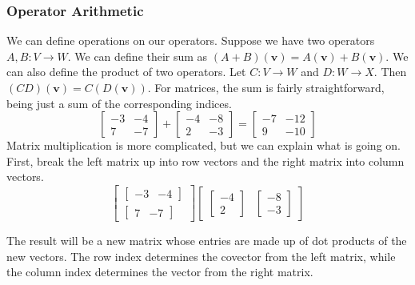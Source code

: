 \documentclass[10pt]{beamer}
\begin{document}
\begin{frame}
  \frametitle{Operator Arithmetic}
  We can define operations on our operators. Suppose we have two operators $A, B: V\rightarrow W$. We can define their sum as $\left(A + B\right)(\mathbf{v}) = A(\mathbf{v}) + B(\mathbf{v})$. We can also define the product of two operators. Let $C: V\rightarrow W$ and $D: W\rightarrow X$. Then $\left(CD\right)(\mathbf{v}) = C\left(D(\mathbf{v})\right)$. For matrices, the sum is fairly straightforward, being just a sum of the corresponding indices.
  $$\left[\begin{matrix}
      -3 & -4\\
      7 & -7
    \end{matrix}\right] + \left[\begin{matrix}
      -4 & -8\\
      2 & -3
    \end{matrix}\right] = \left[\begin{matrix}
      -7 & -12\\
      9 & -10
    \end{matrix}\right]$$
  Matrix multiplication is more complicated, but we can explain what is going on. First, break the left matrix up into row vectors and the right matrix into column vectors.
  $$\left[\begin{matrix}
      \left[\begin{matrix}
          -3 & -4\end{matrix}\right] \\
      \left[\begin{matrix}
          7 & -7\end{matrix}\right]\end{matrix}\right]\left[\begin{matrix}
      \left[\begin{matrix}
          -4\\
          2\end{matrix}\right] & \left[\begin{matrix}
          -8\\
          -3\end{matrix}\right]\end{matrix}\right]$$

  The result will be a new matrix whose entries are made up of dot products of the new vectors. The row index determines the covector from the left matrix, while the column index determines the vector from the right matrix.
      
\end{frame}
\end{document}
